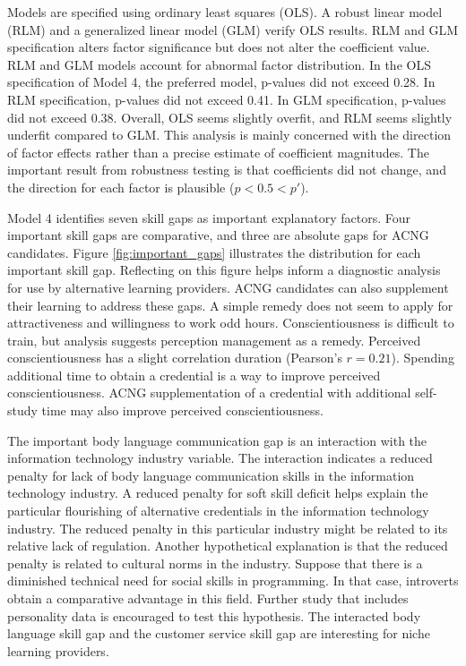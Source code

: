 Models are specified using ordinary least squares (OLS).
A robust linear model (RLM) and a generalized linear model (GLM) verify OLS results.
RLM and GLM specification alters factor significance but does not alter the coefficient value.
RLM and GLM models account for abnormal factor distribution.
In the OLS specification of Model 4, the preferred model, p-values did not exceed 0.28.
In RLM specification, p-values did not exceed 0.41.
In GLM specification, p-values did not exceed 0.38.
Overall, OLS seems slightly overfit, and RLM seems slightly underfit compared to GLM.
This analysis is mainly concerned with the direction of factor effects
rather than a precise estimate of coefficient magnitudes.
The important result from robustness testing is that coefficients did not change,
and the direction for each factor is plausible ($p < 0.5 < p'$).

Model 4 identifies seven skill gaps as important explanatory factors.
Four important skill gaps are comparative, and three are absolute gaps for ACNG candidates.
Figure \ref{fig:important_gaps} illustrates the distribution for each important skill gap.
Reflecting on this figure helps inform a diagnostic analysis for use by alternative learning providers.
ACNG candidates can also supplement their learning to address these gaps.
A simple remedy does not seem to apply for attractiveness and willingness to work odd hours.
Conscientiousness is difficult to train, but analysis suggests perception management as a remedy.
Perceived conscientiousness has a slight correlation duration (Pearson's $r = 0.21$).
Spending additional time to obtain a credential is a way to improve perceived conscientiousness.
ACNG supplementation of a credential with additional self-study time may also improve perceived conscientiousness.

The important body language communication gap is an interaction with the information technology industry variable.
The interaction indicates a reduced penalty for lack of body language communication skills
in the information technology industry.
A reduced penalty for soft skill deficit helps explain the particular flourishing of
alternative credentials in the information technology industry.
The reduced penalty in this particular industry might be related to its relative lack of regulation.
Another hypothetical explanation is that the reduced penalty is related to cultural norms in the industry.
Suppose that there is a diminished technical need for social skills in programming.
In that case, introverts obtain a comparative advantage in this field.
Further study that includes personality data is encouraged to test this hypothesis.
The interacted body language skill gap and the customer service skill gap
are interesting for niche learning providers.

